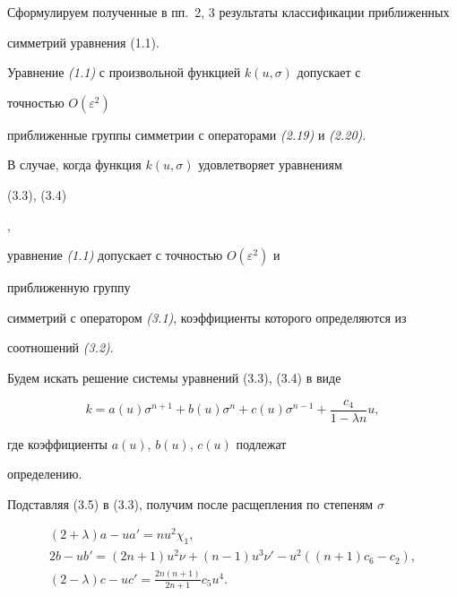 Сформулируем полученные в пп.~2, 3 результаты классификации приближенных


симметрий уравнения (1.1).





\begin{thmnonum}


Уравнение {\em (1.1)} с произвольной функцией $k(u,\sigma)$ допускает с


точностью $O(\varepsilon^2)$


приближенные группы симметрии с операторами {\em (2.19)} и {\em (2.20)}.


В случае, когда функция $k(u,\sigma)$ удовлетворяет уравнениям {\em


(3.3), (3.4)},


уравнение {\em (1.1)} допускает с точностью $O(\varepsilon^2)$ и


приближенную группу


симметрий с оператором {\em (3.1)}, коэффициенты которого определяются из


соотношений {\em (3.2)}.


\end{thmnonum}





Будем искать решение системы уравнений (3.3), (3.4) в виде


\begin{equation}


k=a(u)\sigma^{n+1}+b(u)\sigma^n+c(u)\sigma^{n-1}+


\frac{c_4}{1-\lambda n}u, \tag{3.5}


\end{equation}


где коэффициенты $a(u)$, $b(u)$, $c(u)$ подлежат


определению.


Подставляя (3.5) в (3.3), получим после расщепления по степеням $\sigma$


\begin{gather}


(2+\lambda)a-ua'=nu^2\chi_1,\tag{3.6}\\


2b-ub'=(2n+1)u^2\nu+(n-1)u^3\nu'-u^2((n+1)c_6-c_2),\tag{3.7}\\


(2-\lambda)c-uc'=\frac{2n(n+1)}{2n+1}c_5u^4.\tag{3.8}


\end{gather}


